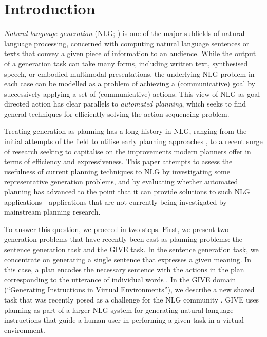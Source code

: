 \section{Introduction}
\label{sec:introduction}

\emph{Natural language generation} (NLG; \citealp{reiter00building})
is one of the major subfields of natural language processing,
concerned with computing natural language sentences or texts that
convey a given piece of information to an audience. While the output
of a generation task can take many forms, including written text,
synthesised speech, or embodied multimodal presentations, the
underlying NLG problem in each case can be modelled as a problem of
achieving a (communicative) goal by successively applying a set of
(communicative) actions. This view of NLG as goal-directed action has
clear parallels to \emph{automated planning}, which seeks to find
general techniques for efficiently solving the action sequencing
problem.

Treating generation as planning has a long history in NLG, ranging
from the initial attempts of the field to utilise early planning
approaches \citep{perrault80,appelt:planning,hovy88,young94dpocl}, to
a recent surge of research
\citep{Steedman-Petrick:07,KolSto07,brenner08:_contin_multiag_plann_approac_to_situat_dialog,benotti08b}
seeking to capitalise on the improvements modern planners offer in
terms of efficiency and expressiveness. This paper attempts to assess
the usefulness of current planning techniques to NLG by investigating
some representative generation problems, and by evaluating whether
automated planning has advanced to the point that it can provide
solutions to such NLG applications---applications that are not
currently being investigated by mainstream planning research.

To answer this question, we proceed in two steps. First, we present
two generation problems that have recently been cast as planning
problems: the sentence generation task and the GIVE task. In the
sentence generation task, we concentrate on generating a single
sentence that expresses a given meaning. In this case, a plan encodes
the necessary sentence with the actions in the plan corresponding to
the utterance of individual words \citep{KolSto07}. In the GIVE domain
(``Generating Instructions in Virtual Environments''), we describe a
new shared task that was recently posed as a challenge for the NLG
community \citep{ByrKolStrCasDalMooObe09}. GIVE uses planning as part
of a larger NLG system for generating natural-language instructions
that guide a human user in performing a given task in a virtual
environment.


